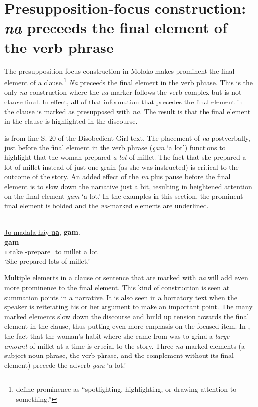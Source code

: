 \section{Presupposition-focus construction: \textit{na} preceeds the final element of the verb phrase}\label{sec:11.5}
\hypertarget{RefHeading1213301525720847}{}
The presupposition-focus construction in Moloko makes prominent the final element of a clause.\footnote{\citet[221]{LongacreHwang2012} define prominence as “spotlighting, highlighting, or drawing attention to something.”} \textit{Na} preceeds the final element in the verb phrase. This is the only \textit{na} construction where the \textit{na}{}-marker follows the verb complex but is not clause final. In effect, all of that information that precedes the final element in the clause is marked as presupposed with \textit{na}. The result is that the final element in the clause is highlighted in the discourse.

 is from line S. 20 of the Disobedient Girl text. The placement of \textit{na} postverbally, just before the final element in the verb phrase (\textit{gam} ‘a lot’) functions to highlight that the woman prepared \textit{a lot} of millet. The fact that she prepared a lot of millet instead of just one grain (as she was instructed) is critical to the outcome of the story. An added effect of the \textit{na} plus pause before the final element is to slow down the narrative just a bit, resulting in heightened attention on the final element \textit{gam} ‘a lot.’ In the examples in this section, the prominent final element is bolded and the \textit{na}-marked elements are underlined.


\ea \label{ex:11:45}\\
\underline{Jo  madala  háy  \textbf{na}},  \textbf{gam}.\\
\gll  {}       \textbf{gam}\\
      \textsc{id}take  {\NOM}-prepare=to  millet  {\PSP} {a lot}\\
\glt  ‘She prepared lots of millet.'
\z

Multiple elements in a clause or sentence that are marked with \textit{na} will add even more prominence to the final element. This kind of construction is seen at summation points in a narrative. It is also seen in a hortatory text when the speaker is reiterating his or her argument to make an important point. The many marked elements slow down the discourse and build up tension towards the final element in the clause, thus putting even more emphasis on the focused item. In , the fact that the woman’s habit where she came from was to grind a \textit{large amount} of millet at a time is crucial to the story. Three \textit{na}-marked elements (a subject noun phrase, the verb phrase, and the complement without its final element) precede the adverb \textit{gam} ‘a lot.’


